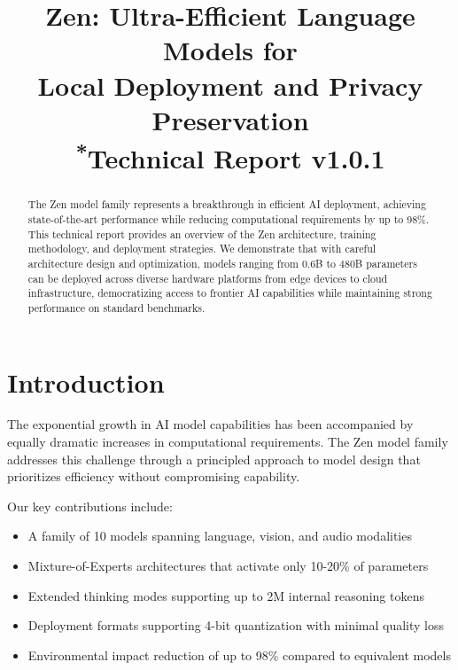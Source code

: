 \documentclass[conference]{IEEEtran}
\begin{document}
\title{Zen: Ultra-Efficient Language Models for\\Local Deployment and Privacy Preservation\\
{\footnotesize \textsuperscript{*}Technical Report v1.0.1}
}

\author{
}

\maketitle

\begin{abstract}
The Zen model family represents a breakthrough in efficient AI deployment, achieving state-of-the-art performance while reducing computational requirements by up to 98\%. This technical report provides an overview of the Zen architecture, training methodology, and deployment strategies. We demonstrate that with careful architecture design and optimization, models ranging from 0.6B to 480B parameters can be deployed across diverse hardware platforms from edge devices to cloud infrastructure, democratizing access to frontier AI capabilities while maintaining strong performance on standard benchmarks.
\end{abstract}

\section{Introduction}

The exponential growth in AI model capabilities has been accompanied by equally dramatic increases in computational requirements. The Zen model family addresses this challenge through a principled approach to model design that prioritizes efficiency without compromising capability.

Our key contributions include:
\begin{itemize}
    \item A family of 10 models spanning language, vision, and audio modalities
    \item Mixture-of-Experts architectures that activate only 10-20\% of parameters
    \item Extended thinking modes supporting up to 2M internal reasoning tokens
    \item Deployment formats supporting 4-bit quantization with minimal quality loss
    \item Environmental impact reduction of up to 98\% compared to equivalent models
\end{itemize}
\end{document}
